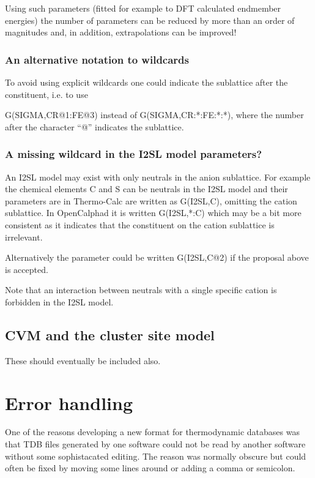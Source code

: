 \documentclass{article}
\begin{document}
Using such parameters (fitted for example to DFT calculated endmember
energies) the number of parameters can be reduced by more than an
order of magnitudes and, in addition, extrapolations can be improved!

\subsubsection{An alternative notation to wildcards}

To avoid using explicit wildcards one could indicate the sublattice
after the constituent, i.e. to use

G(SIGMA,CR@1:FE@3) instead of G(SIGMA,CR:*:FE:*:*), where the number
after the character ``@'' indicates the sublattice.

\subsubsection{A missing wildcard in the I2SL model parameters?}

An I2SL model may exist with only neutrals in the anion sublattice.
For example the chemical elements C and S can be neutrals in the I2SL
model and their parameters are in Thermo-Calc are written as
G(I2SL,C), omitting the cation sublattice.  In OpenCalphad it is
written G(I2SL,*:C) which may be a bit more consistent as it indicates
that the constituent on the cation sublattice is irrelevant.

Alternatively the parameter could be written G(I2SL,C@2) if the
proposal above is accepted.

Note that an interaction between neutrals with a single specific
cation is forbidden in the I2SL model.


\subsection{CVM and the cluster site model}

These should eventually be included also.

\section{Error handling}

One of the reasons developing a new format for thermodynamic databases
was that TDB files generated by one software could not be read by
another software without some sophistacated editing.  The reason was
normally obscure but could often be fixed by moving some lines around
or adding a comma or semicolon.
\end{document}
